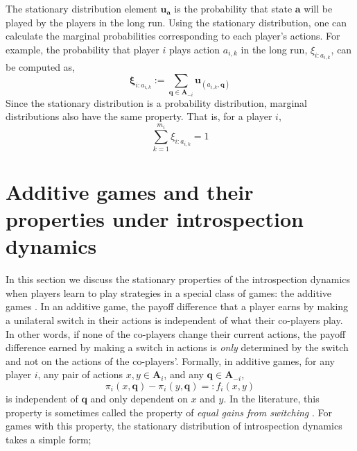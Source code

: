 \documentclass[11pt]{article}
\theoremstyle{plainCl1}
\theoremstyle{plainCl2}
\newcommand{\A}{\mathbf{A}}
\newcommand{\abf}{\mathbf{a}}
\newcommand{\qbf}{\mathbf{q}}
\newcommand{\ubf}{\mathbf{u}}
\begin{document}
\noindent The stationary distribution element $\ubf_\abf$ is the probability that state $\abf$ will be played by the players in the long run. Using the stationary distribution, one can calculate the marginal probabilities corresponding to each player's actions. For example, the probability that player $i$ plays action $a_{i,k}$ in the long run, $\xi_{i:a_{i,k}}$, can be computed as,
\begin{equation}
\mathbf{\xi}_{i:a_{i,k}} := \sum_{\qbf \in \A_{-i}} \ubf_{(a_{i,k}, \qbf)}
\label{Eq:marginal-definition}
\end{equation}
\noindent Since the stationary distribution is a probability distribution, marginal distributions also have the same property. That is, for a player $i$, 
\begin{equation}
\sum_{k = 1}^{m_i} \xi_{i:a_{i,k}}= 1
\label{Eq:marginal-prob-dist}
\end{equation}
\section*{Additive games and their properties under introspection dynamics}
In this section we discuss the stationary properties of the introspection dynamics when players learn to play strategies in a special class of games: the additive games \cite{McAvoy:PlosCB:2015, Pena:JTB:2014}. In an additive game, the payoff difference that a player earns by making a unilateral switch in their actions is independent of what their co-players play. In other words, if none of the co-players change their current actions, the payoff difference earned by making a switch in actions is \emph{only} determined by the switch and not on the actions of the co-players'. Formally, in additive games, for any player $i$, any pair of actions $x,y \in \A_i$, and any $\qbf \in \A_{-i}$,
\begin{equation}
\pi_i(x, \qbf) - \pi_i(y, \qbf) =: f_i(x,y) 
\end{equation}
\noindent is independent of $\qbf$ and only dependent on $x$ and $y$. In the literature, this property is sometimes called the property of \emph{equal gains from switching} \cite{Pena:JTB:2014}. For games with this property, the stationary distribution of introspection dynamics takes a simple form;
\end{document}
